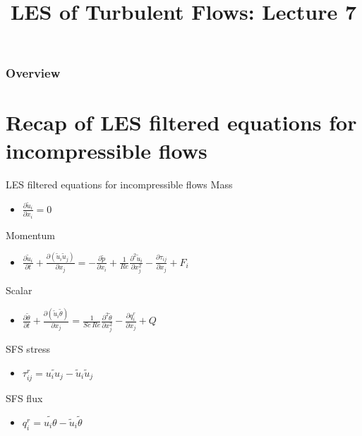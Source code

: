 
\title{LES of Turbulent Flows: Lecture 7}



\begin{frame} 
  \titlepage
\end{frame}


\begin{frame}
\frametitle{Overview}
\tableofcontents
\end{frame}

\section{Recap of LES filtered equations for incompressible flows} %

\begin{frame}{LES filtered equations for incompressible flows}
Mass
\begin{itemize}
	\item $\frac{\partial \tilde u_i}{\partial x_i} = 0$
\end{itemize}

Momentum
\begin{itemize}
\item $\frac{\partial \tilde u_i}{\partial t} + \frac{\partial (\tilde u_i \tilde u_j)}{\partial x_j} = - \frac{\partial \tilde p}{\partial x_i} + \frac{1}{Re} \frac{\partial^2 \tilde u_i}{\partial x_j^{2}} -\frac{\partial \tau_{ij}}{\partial x_j}+ F_i$
\end{itemize}

Scalar
\begin{itemize}
	\item $\frac{\partial \tilde \theta}{\partial t} + \frac{\partial (\tilde u_i \tilde \theta)}{\partial x_j} = \frac{1}{Sc\ Re} \frac{\partial^2 \tilde \theta}{\partial x_j^{2}} -\frac{\partial q_i^r}{\partial x_j}+ Q$
\end{itemize}

SFS stress
\begin{itemize}
	\item $\tau_{ij}^r = \widetilde{u_i u_j} - \tilde u_i \tilde u_j$
\end{itemize}

SFS flux
\begin{itemize}
	\item $q_{i}^r = \widetilde{u_i \theta} - \tilde u_i \tilde \theta$
\end{itemize}
\end{frame}

